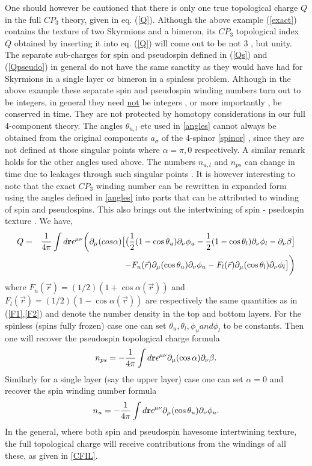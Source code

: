 One should however be cautioned that 
there is only one true topological charge $Q$ in the full $CP_{3}$ theory, 
given in eq. (\ref{Q}). 
Although the above example (\ref{exact}) contains the texture 
of two Skyrmions
and a bimeron, its $CP_{3}$ topological index $Q$ obtained by 
inserting it into eq. (\ref{Q}) will come out to be 
not 3 , but unity. 
The separate sub-charges for spin and pseudospin defined in (\ref{Qs}) and
(\ref{Qpseudo}) in general do not have the same sanctity as they would 
have had 
for Skyrmions in a single layer or bimeron in a spinless problem. 
Although in the above example these separate spin and pseudospin 
winding numbers turn out to be integers, in general 
they need \underline{not} be integers , or more importantly , 
be conserved in time. They are not protected by 
homotopy considerations in our full 4-component theory. The angles 
$\theta_{u,l} $ etc used in \ref{angles} cannot always be
obtained from the original components $a_{\sigma}$ of the
4-spinor \ref{spinor}
, since they
are not defined at those singular points where $\alpha = \pi , 0$ 
respectively. A similar remark holds for the other angles used above. 
The numbers $n_{u,l}$ and $n_{ps}$ can change 
in time due to leakages through such singular points . 
It is however interesting to note that the 
exact $CP_{3}$ winding number can be rewritten in expanded form 
using the angles defined in \ref{angles} into parts that can 
be attributed to winding of spin and pseudospins. This also brings out the
intertwining of spin - psedospin texture . We have,
\begin{eqnarray}
Q &=& \frac{1}{4\pi} \int d{\bf r} \epsilon^{\mu \nu} \bigg( \partial_{\mu}
(cos \alpha) \big{[}
\big{(} \frac{1}{2}(1- \cos \theta_{u})\partial_{\nu} \phi_{u} -
\frac{1}{2}(1 - \cos \theta_{l})
\partial_{\nu} \phi_{l} -\partial_{\nu} \beta \big{] }
\nonumber \\ 
& &
- F_{u}(\vec{r})\partial_{\mu}(\cos \theta_{u})\partial_{\nu} \phi_{u}
- F_{l}(\vec{r})\partial_{\mu}(\cos \theta_{l})\partial_{\nu} \phi_{l} \big{]}
\bigg)\label{CFIL} \end{eqnarray} 
where $F_{u}(\vec{r}) = (1/2) (1 + \cos \alpha(\vec{r}))$ and
$F_{l}(\vec{r}) = (1/2) (1 - \cos \alpha(\vec{r}))$ are respectively
the same quantities as in (\ref{F1},\ref{F2}) and
denote the number density in the top and bottom layers.
For the spinless (spins fully frozen) case one can set $\theta_{u}
,\theta_{l} , \phi_{u} and 
\phi_{l} $ to be constants. Then 
one will recover the pseudospin topological charge
formula
\begin{equation} n_{ps} = -\frac{1}{4 \pi} \int d{\bf r} \epsilon^{\mu \nu} \partial_{\mu}
(\cos \alpha) \partial_{\nu} \beta. \end{equation}
Similarly for a single layer (say the upper layer) case one can set
$\alpha = 0$ and recover
the spin winding number formula
\begin{equation} n_{u} = -\frac{1}{4 \pi} \int d{\bf r} \epsilon^{\mu \nu} \partial_{\mu}
(\cos \theta_{u}) \partial_{\nu} \phi_{u}. \end{equation}
In the general, where both spin and pseudospin havesome intertwining texture,
the full topological charge will receive contributions from the windings
of all these, as given in \ref{CFIL}.

